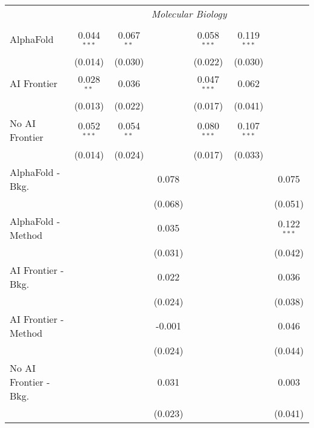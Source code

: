 \begin{tabular}{lcccccc}
 & \multicolumn{6}{c}{\textit{Molecular Biology}} \\ \\
   AlphaFold               & 0.044$^{***}$ & 0.067$^{**}$ &              & 0.058$^{***}$ & 0.119$^{***}$ &   \\   
                           & (0.014)       & (0.030)      &              & (0.022)       & (0.030)       &   \\   
   AI Frontier             & 0.028$^{**}$  & 0.036        &              & 0.047$^{***}$ & 0.062         &   \\   
                           & (0.013)       & (0.022)      &              & (0.017)       & (0.041)       &   \\   
   No AI Frontier          & 0.052$^{***}$ & 0.054$^{**}$ &              & 0.080$^{***}$ & 0.107$^{***}$ &   \\   
                           & (0.014)       & (0.024)      &              & (0.017)       & (0.033)       &   \\   
   AlphaFold - Bkg.        &               &              & 0.078        &               &               & 0.075\\   
                           &               &              & (0.068)      &               &               & (0.051)\\   
   AlphaFold - Method      &               &              & 0.035        &               &               & 0.122$^{***}$\\   
                           &               &              & (0.031)      &               &               & (0.042)\\   
   AI Frontier - Bkg.      &               &              & 0.022        &               &               & 0.036\\   
                           &               &              & (0.024)      &               &               & (0.038)\\   
   AI Frontier - Method    &               &              & -0.001       &               &               & 0.046\\   
                           &               &              & (0.024)      &               &               & (0.044)\\   
   No AI Frontier - Bkg.   &               &              & 0.031        &               &               & 0.003\\   
                           &               &              & (0.023)      &               &               & (0.041)\\   

\end{tabular}
